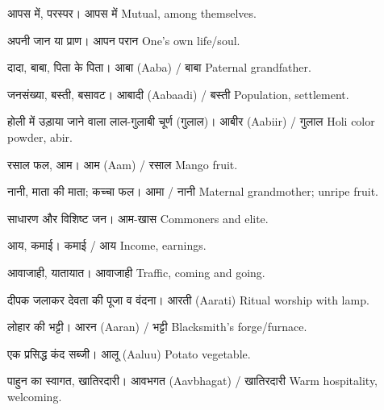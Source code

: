 %
{आपस में, परस्पर।}%
{आपस में}%
{Mutual, among themselves.}

%
{अपनी जान या प्राण।}%
{आपन परान}%
{One's own life/soul.}

%
{दादा, बाबा, पिता के पिता।}%
{आबा (Aaba) / बाबा}%
{Paternal grandfather.}

%
{जनसंख्या, बस्ती, बसावट।}%
{आबादी (Aabaadi) / बस्ती}%
{Population, settlement.}

%
{होली में उड़ाया जाने वाला लाल-गुलाबी चूर्ण (गुलाल)।}%
{आबीर (Aabiir) / गुलाल}%
{Holi color powder, abir.}

%
{रसाल फल, आम।}%
{आम (Aam) / रसाल}%
{Mango fruit.}

%
{नानी, माता की माता; कच्चा फल।}%
{आमा / नानी}%
{Maternal grandmother; unripe fruit.}

%
{साधारण और विशिष्ट जन।}%
{आम-खास}%
{Commoners and elite.}

%
{आय, कमाई।}%
{कमाई / आय}%
{Income, earnings.}

%
{आवाजाही, यातायात।}%
{आवाजाही}%
{Traffic, coming and going.}

%
{दीपक जलाकर देवता की पूजा व वंदना।}%
{आरती (Aarati)}%
{Ritual worship with lamp.}

%
{लोहार की भट्टी।}%
{आरन (Aaran) / भट्टी}%
{Blacksmith's forge/furnace.}

%
{एक प्रसिद्ध कंद सब्जी।}%
{आलू (Aaluu)}%
{Potato vegetable.}

%
{पाहुन का स्वागत, खातिरदारी।}%
{आवभगत (Aavbhagat) / खातिरदारी}%
{Warm hospitality, welcoming.}

